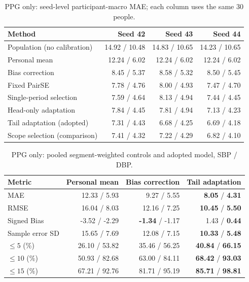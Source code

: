 \documentclass[conference]{IEEEtran}
\begin{document}
\begin{table}[!ht]\centering\scriptsize\caption{PPG only: seed-level participant-macro MAE; each column uses the same 30 people.}
\begin{tabular}{lrrr}\toprule Method & Seed 42 & Seed 43 & Seed 44\\\midrule
Population (no calibration) & 14.92 / 10.48 & 14.83 / 10.65 & 14.23 / 10.65\\
Personal mean & 12.24 / 6.02 & 12.24 / 6.02 & 12.24 / 6.02\\
Bias correction & 8.45 / 5.37 & 8.58 / 5.32 & 8.50 / 5.45\\
Fixed PairSE & 7.78 / 4.76 & 8.00 / 4.93 & 7.47 / 4.70\\
Single-period selection & 7.59 / 4.64 & 8.13 / 4.94 & 7.44 / 4.45\\
Head-only adaptation & 7.84 / 4.45 & 7.81 / 4.94 & 7.13 / 4.23\\
Tail adaptation (adopted) & 7.31 / 4.43 & 6.68 / 4.25 & 6.69 / 4.18\\
Scope selection (comparison) & 7.41 / 4.32 & 7.22 / 4.29 & 6.82 / 4.10\\
\bottomrule\end{tabular}\end{table}
\begin{table}[!ht]\centering\scriptsize\caption{PPG only: pooled segment-weighted controls and adopted model, SBP / DBP.}\scriptsize
\begin{tabular}{lrrr}\toprule
Metric & Personal mean & Bias correction & Tail adaptation\\\midrule
MAE & 12.33 / 5.93 & 9.27 / 5.55 & \textbf{8.05} / \textbf{4.31}\\
RMSE & 16.04 / 8.03 & 12.16 / 7.25 & \textbf{10.45} / \textbf{5.50}\\
Signed Bias & -3.52 / -2.29 & \textbf{-1.34} / -1.17 & 1.43 / \textbf{0.44}\\
Sample error SD & 15.65 / 7.69 & 12.08 / 7.15 & \textbf{10.33} / \textbf{5.48}\\
$\leq5$ (\%) & 26.10 / 53.82 & 35.46 / 56.25 & \textbf{40.84} / \textbf{66.15}\\
$\leq10$ (\%) & 50.93 / 82.68 & 63.00 / 84.11 & \textbf{68.42} / \textbf{93.03}\\
$\leq15$ (\%) & 67.21 / 92.76 & 81.71 / 95.19 & \textbf{85.71} / \textbf{98.81}\\
\bottomrule\end{tabular}\end{table}
\end{document}

